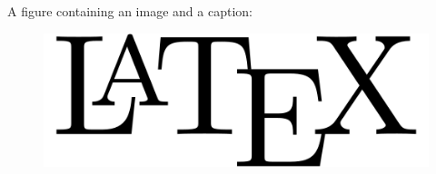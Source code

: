 A figure containing an image and a caption:
\begin{figure}[H]
    \includegraphics[width=0.8\linewidth]{LaTeX-logo.png}
\end{figure}
